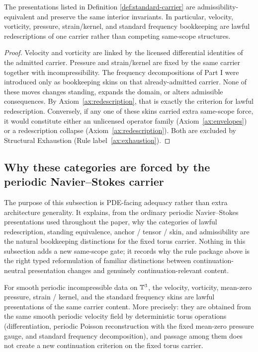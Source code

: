 \begin{lemma}\label{prop:equiv-completion-NS}
The presentations listed in Definition \ref{def:standard-carrier} are admissibility-equivalent and
preserve the same interior invariants. In particular, velocity, vorticity, pressure, strain/kernel, and
standard frequency bookkeeping are lawful redescriptions of one carrier rather than competing
same-scope structures.
\end{lemma}

\begin{proof}
Velocity and vorticity are linked by the licensed differential identities of the admitted carrier.
Pressure and strain/kernel are fixed by the same carrier together with incompressibility. The
frequency decompositions of Part I were introduced only as bookkeeping skins on that already-admitted
carrier. None of these moves changes standing, expands the domain, or alters admissible
consequences. By Axiom~\ref{ax:redescription}, that is exactly the criterion for lawful redescription.
Conversely, if any one of these skins carried extra same-scope force, it would constitute either an
unlicensed operator family (Axiom~\ref{ax:envelopes}) or a redescription collapse (Axiom~\ref{ax:redescription}).
Both are excluded by Structural Exhaustion (Rule label~\ref{ax:exhaustion}).

\end{proof}

\subsection{Why these categories are forced by the periodic Navier--Stokes carrier}
\label{subsec:pde-facing-adequacy}
The purpose of this subsection is PDE-facing adequacy rather than extra architecture generality.  It explains,
from the ordinary periodic Navier--Stokes presentations used throughout the paper, why the categories of
lawful redescription, standing equivalence, anchor / tensor / skin, and admissibility are the natural
bookkeeping distinctions for the fixed torus carrier.  Nothing in this subsection adds a new same-scope
gate; it records why the rule package above is the right typed reformulation of familiar distinctions
between continuation-neutral presentation changes and genuinely continuation-relevant content.

\begin{proposition}
\label{prop:adequacy-lawful-redescription}
For smooth periodic incompressible data on $\mathbb{T}^3$, the velocity, vorticity, mean-zero pressure,
strain / kernel, and the standard frequency skins are lawful presentations of the same carrier content.
More precisely: they are obtained from the same smooth periodic velocity field by deterministic torus
operations (differentiation, periodic Poisson reconstruction with the fixed mean-zero pressure gauge,
and standard frequency decomposition), and passage among them does not create a new continuation
criterion on the fixed torus carrier.
\end{proposition}

